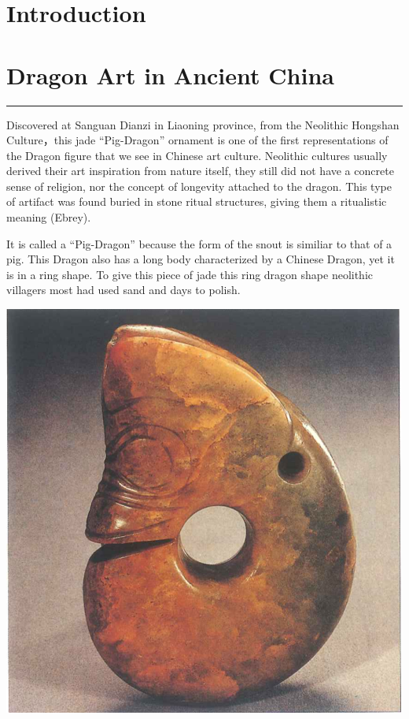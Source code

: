 \documentclass[
]{book}
\begin{document}
\hypertarget{intro}{%
\chapter*{Introduction}\label{intro}}

\hypertarget{ancient}{%
\chapter*{Dragon Art in Ancient China}\label{ancient}}

\begin{center}\rule{0.5\linewidth}{0.5pt}\end{center}

Discovered at Sanguan Dianzi in Liaoning province, from the Neolithic Hongshan Culture，this jade ``Pig-Dragon'' ornament is one of the first representations of the Dragon figure that we see in Chinese art culture. Neolithic cultures usually derived their art inspiration from nature itself, they still did not have a concrete sense of religion, nor the concept of longevity attached to the dragon. This type of artifact was found buried in stone ritual structures, giving them a ritualistic meaning (Ebrey).

It is called a ``Pig-Dragon'' because the form of the snout is similiar to that of a pig. This Dragon also has a long body characterized by a Chinese Dragon, yet it is in a ring shape. To give this piece of jade this ring dragon shape neolithic villagers most had used sand and days to polish.

\includegraphics[width=\textwidth,height=0.35\textheight]{images/Jade_Pig_Dragon.png}
\end{document}
